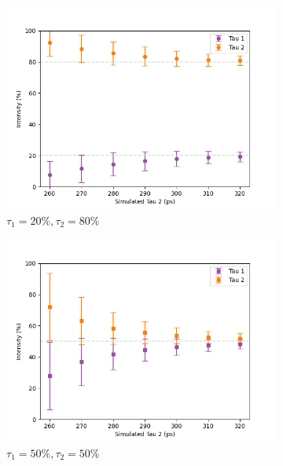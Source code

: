 \begin{figure}[p]
{\begin{subfigure}{0.7\textwidth}
        \centering
        \includegraphics[width=0.95\linewidth]{Batch 3/regular IRF/tau1 220/output/2080.png}
        \caption{$\tau_1 = 20\%, \tau_2 = 80\%$}
        \label{fig:220-2080}
    \end{subfigure}
    \begin{subfigure}{0.7\textwidth}
        \centering
        \includegraphics[width=.95\textwidth]{Batch 3/regular IRF/tau1 220/output/5050.png}
        \caption{$\tau_1 = 50\%, \tau_2 = 50\%$}
        \label{fig:220-5050}
    \end{subfigure}
    }
    \begin{subfigure}{0.7\textwidth}
        \centering

\end{subfigure}
\end{figure}
